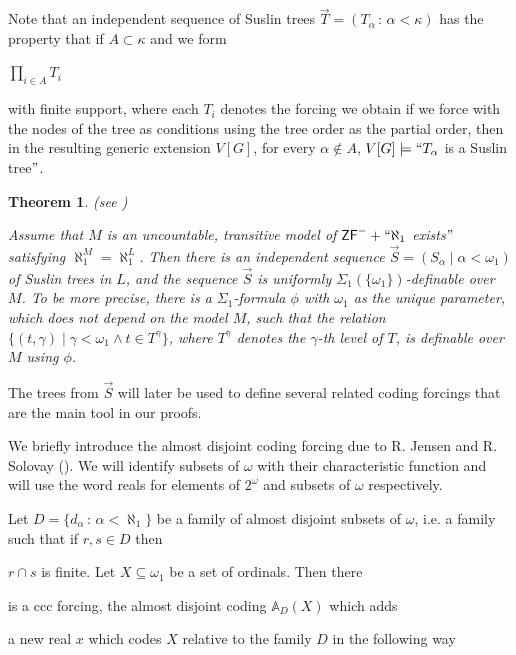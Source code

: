 \documentclass[a4paper,11pt]{article}
\newtheorem{theorem}{Theorem}[section]
\newcommand{\ZF}{\mathsf{ZF}}
\begin{document}
    Note that an independent sequence of Suslin trees $\vec{T} = (T_{\alpha} \, : \, \alpha < \kappa)$ has the property that if $A \subset \kappa$ and we form 
    
    $ \prod_{i \in A} T_i $
    
    with finite support, where each $T_i$ denotes the forcing we obtain if we force with the nodes of the tree  as conditions using the tree order as the partial order, then in the resulting generic extension $V[G]$, for every $\alpha \notin A$, $V[G] \models `` T_{\alpha}$ is a Suslin tree$"$. 
    
    \begin{theorem}\label{DefinitionIndependentSequence}(see \cite{Separation without reduction})
    
    Assume that $M$ is an uncountable, transitive model of $\ZF^{-}+``\aleph_1$ exists$"$ satisfying $\aleph_1^M=\aleph_1^L$. Then there is an independent sequence $\vec{S}=(S_\alpha\mid\alpha<\omega_1)$ of Suslin trees in $L$, and the sequence $\vec{S}$ is uniformly $\Sigma_1(\{\omega_1\})$-definable over $M$. To be more precise, there is a $\Sigma_1$-formula $\phi$  with $\omega_1$ as the unique parameter, which does not depend on the model $M$, such that the relation $\{ (t,\gamma) \mid \gamma < \omega_1 \land t \in T^{\gamma}  \}$, where $T^{\gamma}$ denotes the $\gamma$-th level of $T$, is definable over $M$ using $\phi$. 
    
    \end{theorem}
The trees from $\vec{S}$ will later be used to define several related coding forcings that are the main tool in our proofs.
    

We briefly introduce the almost disjoint coding forcing due to R. Jensen and R. Solovay (\cite{JensenSolovay}). We will identify subsets of $\omega$ with their characteristic function and will use the word reals for elements of $2^{\omega}$ and subsets of $\omega$ respectively.
    
    Let $D=\{d_{\alpha} \, : \, \alpha < \aleph_1 \}$ be a family of almost disjoint subsets of $\omega$, i.e. a family such that if $r, s \in D$ then 
    
    $r \cap s$ is finite. Let $X\subseteq\omega_1$ be a set of ordinals. Then there 
    
    is a ccc forcing, the almost disjoint coding $\mathbb{A}_D(X)$ which adds 
    
    a new real $x$ which codes $X$ relative to the family $D$ in the following way
    
\end{document}
